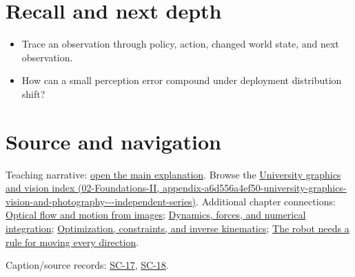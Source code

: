 \section{Recall and next depth}\label{appendix-b0c42da325f1-recall-and-next-depth}

\begin{itemize}
\tightlist
\item
  Trace an observation through policy, action, changed world state, and next observation.
\item
  How can a small perception error compound under deployment distribution shift?
\end{itemize}

\section{Source and navigation}\label{appendix-b0c42da325f1-source-and-navigation}

Teaching narrative: \href{Continuous\%20Notes/University\%20-\%20Worlds,\%20Images\%20and\%20Inference\%20-\%20Graphics,\%20Vision\%20and\%20Photography\#Robot\%20learning\%20closes\%20the\%20perception-action\%20loop}{open the main explanation}. Browse the \href{../02-Foundations-II/main.pdf\#nameddest=appendix-a6d556a4ef50-university-graphics-vision-and-photography---independent-series}{University graphics and vision index (02-Foundations-II, appendix-a6d556a4ef50-university-graphics-vision-and-photography-\/-\/-independent-series)}. Additional chapter connections: \href{Continuous\%20Notes/University\%20-\%20Worlds,\%20Images\%20and\%20Inference\%20-\%20Graphics,\%20Vision\%20and\%20Photography\#Optical\%20flow\%20and\%20motion\%20from\%20images}{Optical flow and motion from images}; \href{Continuous\%20Notes/University\%20-\%20Worlds,\%20Images\%20and\%20Inference\%20-\%20Graphics,\%20Vision\%20and\%20Photography\#Dynamics,\%20forces,\%20and\%20numerical\%20integration}{Dynamics, forces, and numerical integration}; \href{Continuous\%20Notes/University\%20-\%20Worlds,\%20Images\%20and\%20Inference\%20-\%20Graphics,\%20Vision\%20and\%20Photography\#Optimization,\%20constraints,\%20and\%20inverse\%20kinematics}{Optimization, constraints, and inverse kinematics}; \href{Continuous\%20Notes/Computing\%20Foundations\%20-\%20From\%20Bits\%20to\%20C++\%20and\%20Systems\%20APIs\#The\%20robot\%20needs\%20a\%20rule\%20for\%20moving\%20every\%20direction}{The robot needs a rule for moving every direction}.

Caption/source records: \href{Continuous\%20Notes/University\%20-\%20Worlds,\%20Images\%20and\%20Inference\%20-\%20Graphics,\%20Vision\%20and\%20Photography\#SC-17\%20-\%20Stanford\%20CS231N\%20Deep\%20Learning\%20for\%20Computer\%20Vision\%20Spring\%202025\%20Lecture\%2017:\%20Robot\%20Learning}{SC-17}, \href{Continuous\%20Notes/University\%20-\%20Worlds,\%20Images\%20and\%20Inference\%20-\%20Graphics,\%20Vision\%20and\%20Photography\#SC-18\%20-\%20Stanford\%20CS231N\%20Deep\%20Learning\%20for\%20Computer\%20Vision\%20Spring\%202025\%20Lecture\%2018:\%20Human-Centered\%20AI}{SC-18}.
